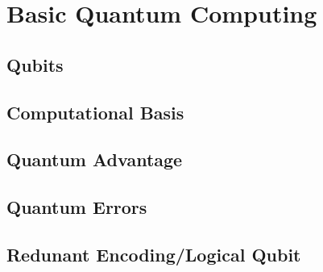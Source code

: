 \section{Basic Quantum Computing}

\subsection{Qubits}

\subsection{Computational Basis}

\subsection{Quantum Advantage}

\subsection{Quantum Errors}

\subsection{Redunant Encoding/Logical Qubit}
